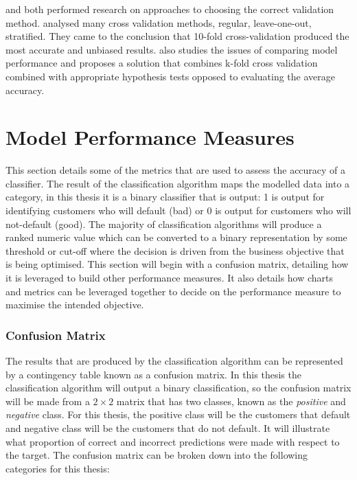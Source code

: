 \cite{kohavi_study_1995} and \cite{salzberg_comparing_1997} both performed research on approaches to choosing the correct validation method. \cite{kohavi_study_1995} analysed many cross validation methods, regular, leave-one-out, stratified. They came to the conclusion that 10-fold cross-validation produced the most accurate and unbiased results. \cite{salzberg_comparing_1997} also studies the issues of comparing model performance and proposes a solution that combines k-fold cross validation combined with appropriate hypothesis tests opposed to evaluating the average accuracy.   

\section{Model Performance Measures}\label{modelPerformMeasure}

This section details some of the metrics that are used to assess the accuracy of a classifier. The result of the classification algorithm maps the modelled data into a category, in this thesis it is a binary classifier that is output: 1 is output for identifying customers who will default (bad) or 0 is output for customers who will not-default (good). The majority of classification algorithms will produce a ranked numeric value which can be converted to a binary representation by some threshold or cut-off where the decision is driven from  the business objective that is being optimised. This section will begin with a confusion matrix, detailing how it is leveraged to build other performance measures. It also details how charts and metrics can be leveraged together to decide on the performance measure to maximise the intended objective.

\subsubsection{Confusion Matrix}

The results that are produced by the classification algorithm can be represented by a contingency table known as a confusion matrix. In this thesis the classification algorithm will output a binary classification, so the confusion matrix will be made from a $2 \times 2$ matrix that has two classes, known as the \textit{positive} and \textit{negative} class. For this thesis, the positive class will be the customers that default and negative class will be the customers that do not default. It will illustrate what proportion of correct and incorrect predictions were made with respect to the target. The confusion matrix can be broken down into the following categories for this thesis:

